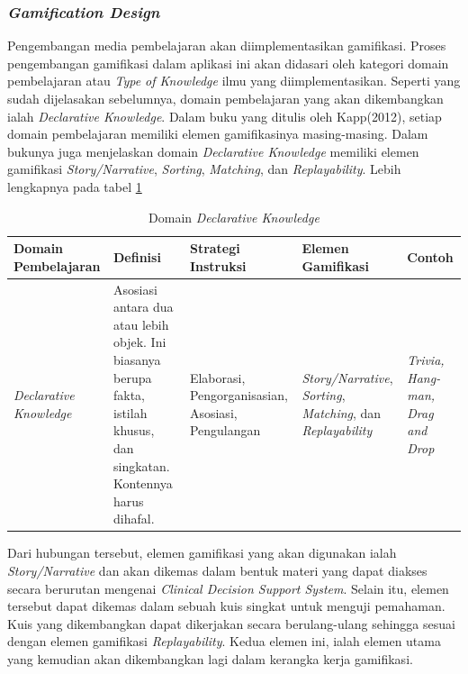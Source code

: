 \subsubsection{\textit{Gamification Design}}
Pengembangan media pembelajaran akan diimplementasikan gamifikasi. Proses pengembangan gamifikasi dalam aplikasi ini akan didasari oleh kategori domain pembelajaran atau \textit{Type of Knowledge} ilmu yang diimplementasikan. Seperti yang sudah dijelasakan sebelumnya, domain pembelajaran yang akan dikembangkan ialah \textit{Declarative Knowledge}.
Dalam buku yang ditulis oleh Kapp(2012), setiap domain pembelajaran memiliki elemen gamifikasinya masing-masing. Dalam bukunya juga menjelaskan domain \textit{Declarative Knowledge} memiliki elemen gamifikasi \textit{Story/Narrative}, \textit{Sorting}, \textit{Matching}, dan \textit{Replayability}.
Lebih lengkapnya pada tabel \ref*{Tab:Declarative-knowledge}
\begin{table}[H]
	\centering
	\caption{Domain \textit{Declarative Knowledge}}
	\begin{tabular}{|p{2.7cm}|p{3cm}|p{2.7cm}|p{2.7cm}|p{2cm}|}
		\hline
		\centering\textbf{Domain Pembelajaran} &\centering\textbf{Definisi}  &\centering\textbf{Strategi Instruksi}  &\centering\textbf{Elemen Gamifikasi} &\multicolumn{1}{m{2cm}|}{\centering \textbf{Contoh}}\\
		\hline
		\textit{Declarative Knowledge} 
		&Asosiasi antara dua atau lebih objek. Ini biasanya berupa fakta, istilah khusus, dan singkatan. Kontennya harus dihafal.
		&Elaborasi, Pengorganisasian, Asosiasi, Pengulangan
		&\textit{Story/Narrative}, \textit{Sorting}, \textit{Matching}, dan \textit{Replayability}
		&\textit{Trivia, Hang-man, Drag and Drop} \\
		\hline
	\end{tabular}
	\label{Tab:Declarative-knowledge}
\end{table}
Dari hubungan tersebut, elemen gamifikasi yang akan digunakan ialah \textit{Story/Narrative} dan akan dikemas dalam bentuk materi yang dapat diakses secara berurutan mengenai \textit{Clinical Decision Support System}. Selain itu, elemen tersebut dapat dikemas dalam sebuah kuis singkat untuk menguji pemahaman.
Kuis yang dikembangkan dapat dikerjakan secara berulang-ulang sehingga sesuai dengan elemen gamifikasi \textit{Replayability}. Kedua elemen ini, ialah elemen utama yang kemudian akan dikembangkan lagi dalam kerangka kerja gamifikasi.

